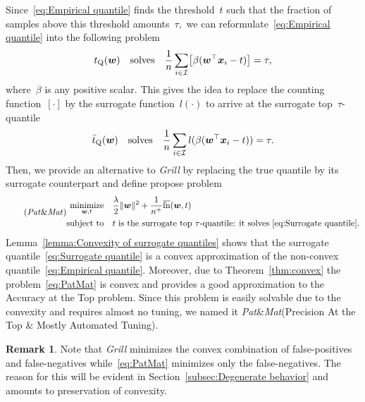 \documentclass[11pt,a4paper]{article}
\theoremstyle{definition}
\newtheorem{remark}[thm]{Remark}
\let\originalleft\left
\let\originalright\right
\renewcommand{\left}{\mathopen{}\mathclose\bgroup\originalleft}
\renewcommand{\right}{\aftergroup\egroup\originalright}
\newcommand{\norm}[1]{\|#1\|}
\newcommand{\minimize}{\operatorname*{minimize}}
\newcommand{\st}{\operatorname{subject\ to}}
\newcommand{\I}{\mathcal{I}}
\newcommand{\fns}{\overline{\textnormal{fn}}}
\newcommand{\grill}{\textit{Grill}\xspace}
\newcommand{\patmat}{\textit{Pat}\textup{\&}\textit{Mat}\xspace}
\begin{document}
Since~\eqref{eq:Empirical quantile} finds the threshold~$t$ such that the fraction of samples above this threshold amounts~$\tau,$ we can reformulate~\eqref{eq:Empirical quantile} into the following problem
\begin{equation}\label{eq:Empirical quantile reformulation}
  t_{\rm Q}(\bm{w}) \quad \text{solves} \quad \frac{1}{n}\sum_{i \in \I}\left[\beta(\bm{w}^\top \bm{x}_i - t)\right] = \tau,
\end{equation}
where~$\beta$ is any positive scalar. This gives the idea to replace the counting function~$[\cdot]$ by the surrogate function~$l(\cdot)$ to arrive at the surrogate top~$\tau$-quantile
\begin{equation}\label{eq:Surrogate quantile} 
  \bar{t}_{\rm Q}(\bm{w}) \quad \text{solves} \quad \frac{1}{n}\sum_{i \in \I}l(\beta(\bm{w}^\top \bm{x}_i - t)) = \tau.
\end{equation}
Then, we provide an alternative to \grill by replacing the true quantile by its surrogate counterpart and define propose problem
\begin{equation}\label{eq:PatMat}\tag{\patmat}
  \begin{aligned}
    \minimize_{\bm{w}, t} & \quad \frac{\lambda}{2}\norm{\bm{w}}^2 + \frac{1}{n^+}\fns(\bm{w},t) \\
    \st                   & \quad t \text{ is the surrogate top \ensuremath{\tau}-quantile: it solves }\eqref{eq:Surrogate quantile}.
  \end{aligned}
\end{equation}
Lemma~\ref{lemma:Convexity of surrogate quantiles} shows that the surrogate quantile~\eqref{eq:Surrogate quantile} is a convex approximation of the non-convex quantile~\eqref{eq:Empirical quantile}. Moreover,  due to Theorem~\ref{thm:convex} the problem~\eqref{eq:PatMat} is convex and provides a good approximation to the Accuracy at the Top problem. Since this problem is easily solvable due to the convexity and requires almost no tuning, we named it \patmat (Precision At the Top \& Mostly Automated Tuning).     

\begin{remark}
  Note that \grill minimizes the convex combination of false-positives and false-negatives while~\eqref{eq:PatMat} minimizes only the false-negatives. The reason for this will be evident in Section~\ref{subsec:Degenerate behavior} and amounts to preservation of convexity.
\end{remark}
\end{document}

